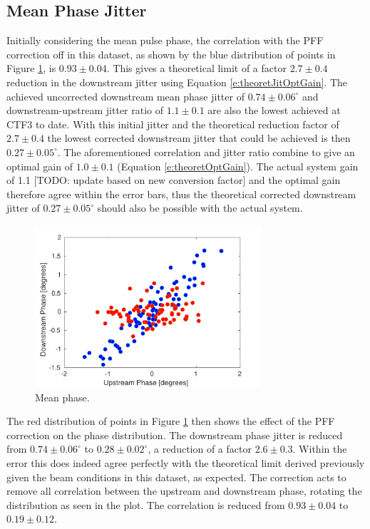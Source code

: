 \subsection{Mean Phase Jitter}
\label{ss:bestMeanJitter}

Initially considering the mean pulse phase, the correlation with the PFF correction off in this dataset, as shown by the blue distribution of points in Figure \ref{f:BestFF_Real}, is \(0.93\pm0.04\). This gives a theoretical limit of a factor \(2.7\pm0.4\) reduction in the downstream jitter using Equation \ref{e:theoretJitOptGain}. The achieved uncorrected downstream mean phase jitter of \(0.74\pm0.06^\circ\) and downstream-upstream jitter ratio of \(1.1\pm0.1\) are also the lowest achieved at CTF3 to date. With this initial jitter and the theoretical reduction factor of \(2.7\pm0.4\) the lowest corrected downstream jitter that could be achieved is then \(0.27\pm0.05^\circ\). The aforementioned correlation and jitter ratio combine to give an optimal gain of \(1.0\pm0.1\) (Equation \ref{e:theoretOptGain}). The actual system gain of 1.1 [TODO: update based on new conversion factor] and the optimal gain therefore agree within the error bars, thus the theoretical corrected downstream jitter of \(0.27\pm0.05^\circ\) should also be possible with the actual system.

\begin{figure}
  \centering
  \includegraphics[width=0.75\textwidth]{Figures/feedforward/BestFF_Real}
  \caption{Mean phase.}
  \label{f:BestFF_Real}
\end{figure}

The red distribution of points in Figure \ref{f:BestFF_Real} then shows the effect of the PFF correction on the phase distribution. The downstream phase jitter is reduced from \(0.74\pm0.06^\circ\) to \(0.28\pm0.02^\circ\), a reduction of a factor \(2.6\pm0.3\).  Within the error this does indeed agree perfectly with the theoretical limit derived previously given the beam conditions in this dataset, as expected. The correction acts to remove all correlation between the upstream and downstream phase, rotating the distribution as seen in the plot. The correlation is reduced from \(0.93\pm0.04\) to \(0.19\pm0.12\). 

